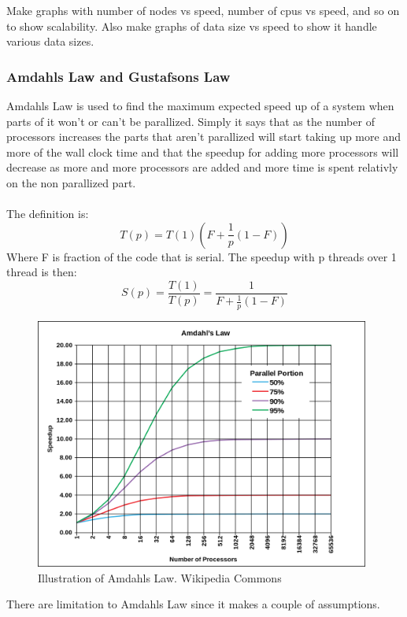 \documentclass[10pt,a4paper]{article}
\begin{document}
Make graphs with number of nodes vs speed, number of cpus vs speed, and so on to show scalability. Also make graphs of data size vs speed to show it handle various data sizes.

\subsubsection{Amdahls Law and Gustafsons Law}
Amdahls Law is used to find the maximum expected speed up of a system when parts of it won't or can't be parallized. Simply it says that as the number of processors increases the parts that aren't parallized will start taking up more and more of the wall clock time and that the speedup for adding more processors will decrease as more and more processors are added and more time is spent relativly on the non parallized part.\\
\\
The definition is:\\
$$T(p)=T(1)(F+\frac{1}{p}(1-F))$$
Where F is fraction of the code that is serial. The speedup with p threads over 1 thread is then:
$$S(p)=\frac{T(1)}{T(p)}=\frac{1}{F+\frac{1}{p}(1-F)}$$

\begin{figure}[h]
    \centering
    \includegraphics[width=11cm]{AmdahlsLaw.png}
    \caption{Illustration of Amdahls Law. Wikipedia Commons}
    \label{fig:AmdahlsLaw}
\end{figure}

There are limitation to Amdahls Law since it makes a couple of assumptions.
\end{document}
